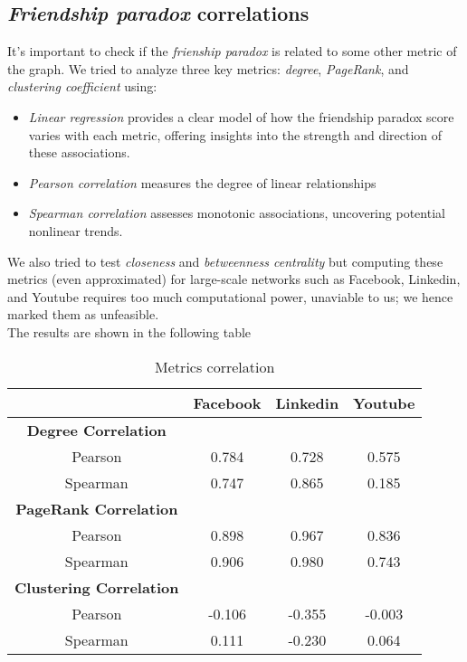 \documentclass{article}
\begin{document}
\subsection{\textit{Friendship paradox} correlations}

It's important to check if the \textit{frienship paradox} is related to some other metric of the graph. We tried to analyze three key metrics: \textit{degree}, \textit{PageRank}, and \textit{clustering coefficient} using:
\begin{itemize}
    \item \textit{Linear regression} provides a clear model of how the friendship paradox score varies with each metric, offering insights into the strength and direction of these associations.
    \item \textit{Pearson correlation} measures the degree of linear relationships
    \item \textit{Spearman correlation} assesses monotonic associations, uncovering potential nonlinear trends.
\end{itemize}
 We also tried to test \textit{closeness} and \textit{betweenness centrality} but computing these metrics (even approximated) for large-scale networks such as Facebook, Linkedin, and Youtube requires too much computational power, unaviable to us; we hence marked them as unfeasible.\\
The results are shown in the following table \\
\begin{table}[H]
    \centering
    \begin{tabular}{|c|c|c|c|}
        \hline
        & Facebook & Linkedin & Youtube \\ \hline
        \textbf{Degree Correlation} & & & \\  \hline
        Pearson & 0.784 & 0.728 & 0.575 \\ \hline
        Spearman  & 0.747 & 0.865 & 0.185 \\ \hline

        \textbf{PageRank Correlation} & & &\\ \hline
        Pearson & 0.898 & 0.967 & 0.836 \\ \hline
        Spearman  & 0.906 & 0.980 & 0.743 \\ \hline

        \textbf{Clustering Correlation} & & &\\ \hline
        Pearson & -0.106 & -0.355 & -0.003 \\ \hline
        Spearman  & 0.111 & -0.230 & 0.064 \\ \hline
    \end{tabular}
    \caption{Metrics correlation}
\end{table} 
\end{document}
